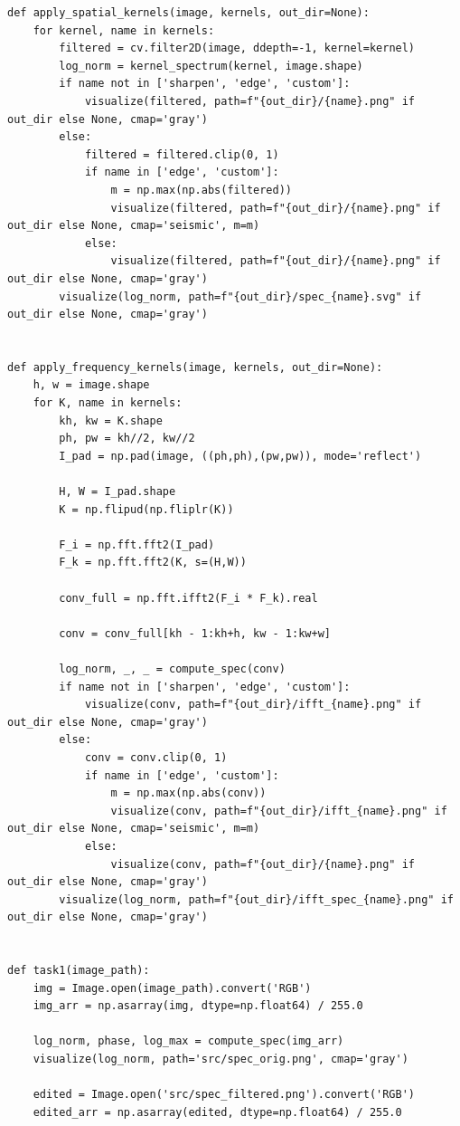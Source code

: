 \documentclass[a4paper]{article}
\begin{document}
\begin{lstlisting}[caption={Исходный код}]
    def apply_spatial_kernels(image, kernels, out_dir=None):
    for kernel, name in kernels:
        filtered = cv.filter2D(image, ddepth=-1, kernel=kernel)
        log_norm = kernel_spectrum(kernel, image.shape)
        if name not in ['sharpen', 'edge', 'custom']:
            visualize(filtered, path=f"{out_dir}/{name}.png" if out_dir else None, cmap='gray')
        else:
            filtered = filtered.clip(0, 1)
            if name in ['edge', 'custom']:
                m = np.max(np.abs(filtered))
                visualize(filtered, path=f"{out_dir}/{name}.png" if out_dir else None, cmap='seismic', m=m)
            else:
                visualize(filtered, path=f"{out_dir}/{name}.png" if out_dir else None, cmap='gray')
        visualize(log_norm, path=f"{out_dir}/spec_{name}.svg" if out_dir else None, cmap='gray')


def apply_frequency_kernels(image, kernels, out_dir=None):
    h, w = image.shape
    for K, name in kernels:
        kh, kw = K.shape
        ph, pw = kh//2, kw//2
        I_pad = np.pad(image, ((ph,ph),(pw,pw)), mode='reflect')

        H, W = I_pad.shape
        K = np.flipud(np.fliplr(K))

        F_i = np.fft.fft2(I_pad)
        F_k = np.fft.fft2(K, s=(H,W))

        conv_full = np.fft.ifft2(F_i * F_k).real

        conv = conv_full[kh - 1:kh+h, kw - 1:kw+w]        
        
        log_norm, _, _ = compute_spec(conv)
        if name not in ['sharpen', 'edge', 'custom']:
            visualize(conv, path=f"{out_dir}/ifft_{name}.png" if out_dir else None, cmap='gray')
        else:
            conv = conv.clip(0, 1)
            if name in ['edge', 'custom']:
                m = np.max(np.abs(conv))
                visualize(conv, path=f"{out_dir}/ifft_{name}.png" if out_dir else None, cmap='seismic', m=m)
            else:
                visualize(conv, path=f"{out_dir}/{name}.png" if out_dir else None, cmap='gray')
        visualize(log_norm, path=f"{out_dir}/ifft_spec_{name}.png" if out_dir else None, cmap='gray')


def task1(image_path):
    img = Image.open(image_path).convert('RGB')
    img_arr = np.asarray(img, dtype=np.float64) / 255.0

    log_norm, phase, log_max = compute_spec(img_arr)
    visualize(log_norm, path='src/spec_orig.png', cmap='gray')

    edited = Image.open('src/spec_filtered.png').convert('RGB')
    edited_arr = np.asarray(edited, dtype=np.float64) / 255.0


\end{lstlisting}
\end{document}
